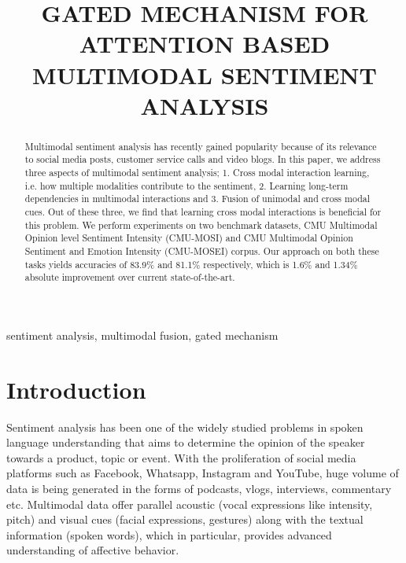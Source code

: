 \documentclass{article}
\title{GATED MECHANISM FOR ATTENTION BASED MULTIMODAL SENTIMENT ANALYSIS}
\begin{document}
\thispagestyle{fancy}




\maketitle
\begin{abstract}
Multimodal sentiment analysis has recently gained popularity because of its relevance to social media posts, customer service calls and video blogs. 
In this paper, we address three aspects of multimodal sentiment analysis; 1. Cross modal interaction learning, i.e. how multiple modalities contribute to the sentiment, 2. Learning long-term dependencies in multimodal interactions and 3. Fusion of unimodal and cross modal cues. Out of these three, we find that learning cross modal interactions is beneficial for this problem.
We perform experiments on two benchmark datasets, CMU Multimodal Opinion level Sentiment Intensity (CMU-MOSI) and CMU Multimodal Opinion Sentiment and Emotion Intensity (CMU-MOSEI) corpus. Our approach on both these tasks yields accuracies of 83.9\% and 81.1\% respectively, which is 1.6\% and 1.34\% absolute improvement over current state-of-the-art.
\end{abstract}
\begin{keywords}
sentiment analysis, multimodal fusion, gated mechanism
\end{keywords}
\section{Introduction}
\label{sec:intro}

Sentiment analysis has been one of the widely studied problems in spoken language understanding that aims to determine the opinion of the speaker towards a product, topic or event. With the proliferation of social media platforms such as Facebook, Whatsapp, Instagram and YouTube, huge volume of data is being generated in the forms of podcasts, vlogs, interviews, commentary etc. Multimodal data offer parallel acoustic (vocal expressions like intensity, pitch) and visual cues (facial expressions, gestures) along with the textual information (spoken words), which in particular, provides advanced understanding of affective behavior.
\end{document}
